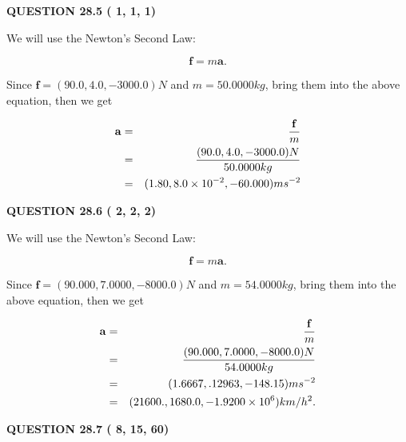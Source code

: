 \documentclass[12pt]{article}
\begin{document}
  
  
\vspace{0.2in}
  
{\textbf{\Large{QUESTION
28.5 
 (          1,          1,          1)
}}}
  
  


 
 

We will use the Newton's Second Law:
 
\[
\mathbf{f}=m\mathbf{a}.
\]
 
Since $\mathbf{f}= %
(90.0 , 4.0 , -3000.0) N$
and $m= %
50.0000kg$, bring them into the above equation, then we get
 
\begin{eqnarray*}
\mathbf{a}&=&\frac{\mathbf{f}}m  \\
&=&\frac{ %
(90.0 , 4.0 , -3000.0) N}{ %
50.0000kg}  \\
&=& %
(1.80 , 8.0 \times 10^{-2} , -60.000) ms^{-2}
\end{eqnarray*}
 
 
 
  
\vspace{0.2in}
  
{\textbf{\Large{QUESTION
28.6 
 (          2,          2,          2)
}}}
  
  
 
 

We will use the Newton's Second Law:
 
\[
\mathbf{f}=m\mathbf{a}.
\]
 
Since $\mathbf{f}=( %
90.000,  %
7.0000,  %
-8000.0 )N$
and $m= %
54.0000kg$, bring them into the above equation, then we get
 
\begin{eqnarray*}
\mathbf{a}&=&\frac{\mathbf{f}}m  \\
&=&\frac{(
90.000 ,
7.0000 ,
-8000.0 )N
}{ %
54.0000 kg}  \\
&=&(
1.6667 ,
.12963,
-148.15
)ms^{-2} \\
&=&(
21600. ,
1680.0 ,
-1.9200 \times 10^{6}
)km/h^2.
\end{eqnarray*}
 
 
 
  
\vspace{0.2in}
  
{\textbf{\Large{QUESTION
28.7 
 (          8,         15,         60)
}}}
  
  
 
 

 
 
\end{document}
